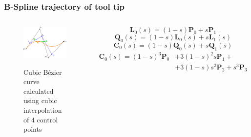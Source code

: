 \begin{frame}
\frametitle{B-Spline trajectory of tool tip}
\begin{columns}
\begin{center}
\begin{figure}[!htb]
\centering
\includegraphics[width=\textwidth]{../images/bezier-curve.png}\\
\caption{Cubic B\'ezier curve calculated using cubic interpolation of 4 control points} 
\end{figure}
\end{center}

\[
\mathbf{L}_0(s) = (1-s)\mathbf{P}_0 + s\mathbf{P}_1
\]
\[
\mathbf{Q}_0(s) = (1-s)\mathbf{L}_0(s) + s\mathbf{L}_1(s)
\]
\[
\mathbf{C}_0(s) = (1-s)\mathbf{Q}_0(s) + s\mathbf{Q}_1(s)
\]
\begin{align*}
    \mathbf{C}_0(s) = (1-s)^3\mathbf{P}_0 &+ 3(1-s)^2 s\mathbf{P}_1 + \\ &+ 3(1-s)s^2\mathbf{P}_2 + s^3\mathbf{P}_3
\end{align*}
\end{columns}
\end{frame}


